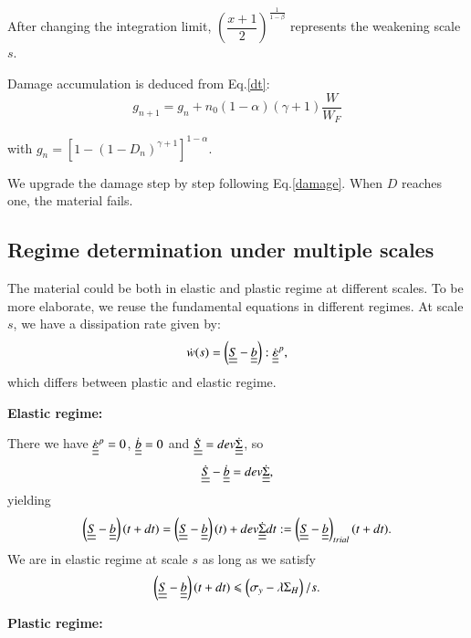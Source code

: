 \documentclass[3p,times,number,review]{elsarticle}
\begin{document}
After changing the integration limit, $\left( \dfrac{x+1}{2}\right) ^{\frac{1}{1-\beta}}$ represents the weakening scale $s$. 

Damage accumulation is deduced from Eq.\eqref{dt}:
\begin{equation}
g_{n+1}=g_n+n_0(1-\alpha)(\gamma+1)\dfrac{W}{W_F}
\label{damage}
\end{equation}

with $g_n=\left[ 1-\left( 1-D_{n}\right)^{\gamma+1} \right]^{1-\alpha}$.

We upgrade the damage step by step following Eq.\eqref{damage}. When $D$ reaches one, the material fails. 

\subsection{Regime determination under multiple scales}
The material could be both in elastic and plastic regime at different scales. To be more elaborate, we reuse the fundamental equations in different regimes. At scale $s$, we have a dissipation rate given by:
$$\dot{w}(s)=\left( \uline{\uline{S}}-\uline{\uline{b}}\right):\dot{\uline{\uline{\varepsilon}}}^p, $$
which differs between plastic and elastic regime.

\vspace{6pt}
\noindent
\textbf{Elastic regime:}

\vspace{6pt}
\noindent
There we have
$\dot{\uline{\uline{\varepsilon}}}^p=0$, $\dot{\uline{\uline{b}}}=0$ and $\dot{\uline{\uline{S}}}=dev\dot{\uline{\uline{\Sigma}}}$, so
$$\dot{\uline{\uline{S}}}-\dot{\uline{\uline{b}}}=dev\dot{\uline{\uline{\Sigma}}},$$ 
yielding
\begin{equation}
\left( \uline{\uline{S}}-\uline{\uline{b}}\right) (t+dt)=\left( \uline{\uline{S}}-\uline{\uline{b}}\right) (t)+dev\dot{\uline{\uline{\Sigma}}}dt:=\left(  \uline{\uline{S}}-\uline{\uline{b}}\right)_{trial}(t+dt).
\label{trial}
\end{equation}
We are in elastic regime at scale $s$ as long as we satisfy
$$\left( \uline{\uline{S}}-\uline{\uline{b}}\right) (t+dt)\leqslant \left(\sigma_y-\lambda \Sigma_H\right)/s.$$

\vspace{6pt}
\noindent
\textbf{Plastic regime:}
\end{document}
